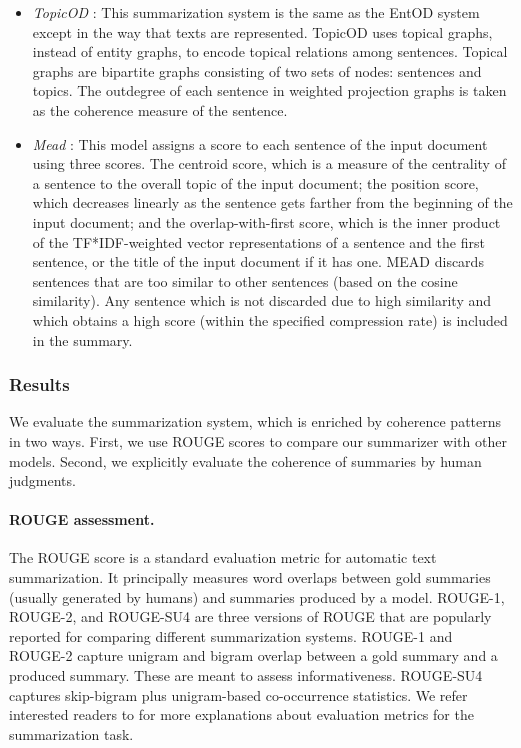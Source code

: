 \begin{itemize}
    \item \emph{TopicOD} \cite{parveen15b}: 
    This summarization system is the same as the EntOD system except in the way that texts are represented. 
    TopicOD uses topical graphs, instead of entity graphs, to encode topical relations among sentences. 
    Topical graphs are bipartite graphs consisting of two sets of nodes: sentences and topics. 
    The outdegree of each sentence in weighted projection graphs is taken as the coherence measure of the sentence.

    \item \emph{Mead} \cite{radev04b}: This model assigns a score to each sentence of the input document using three scores. The centroid score, which is a measure of the centrality of a sentence to the overall topic of the input document; the position score, which decreases linearly as the sentence gets farther from the beginning of the input document; and the \mbox{overlap-with-first} score, which is the inner product of the TF*IDF-weighted vector representations of a sentence and the first sentence, or the title of the input document if it has one.  
    MEAD discards sentences that are too similar to other sentences (based on the cosine similarity). 
    Any sentence which is not discarded due to high similarity and which obtains a high score (within the specified compression rate) is included in the summary. 
	
\end{itemize}


\subsubsection{Results }
We evaluate the summarization system, which is enriched by coherence patterns in two ways. 
First, we use ROUGE scores to compare our summarizer with other models. 
Second, we explicitly evaluate the coherence of summaries by human judgments.

\paragraph{ROUGE assessment.}
The ROUGE score \cite{linchinyew04} is a standard evaluation metric for automatic text summarization. 
It principally measures word overlaps between gold summaries (usually generated by humans) and summaries produced by a model. 
ROUGE-1, ROUGE-2, and ROUGE-SU4 are three versions of ROUGE that are popularly reported for comparing different summarization systems. 
ROUGE-1 and ROUGE-2 capture unigram and bigram overlap between a gold summary and a produced summary. 
These are meant to assess informativeness. 
ROUGE-SU4 captures skip-bigram plus unigram-based co-occurrence statistics. 
We refer interested readers to   for more explanations about evaluation metrics for the summarization task. 

